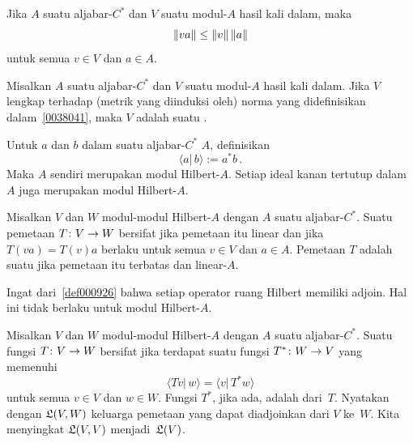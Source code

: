 \begin{prop} Jika $A$ suatu aljabar-$C^*$ dan $V$ suatu modul-$A$ hasil kali dalam, maka
  \[ \lVert va\rVert \le \lVert v\rVert\, \lVert a\rVert \]
untuk semua $v \in V$ dan $a \in A$.
\end{prop}

\begin{defn} Misalkan $A$ suatu aljabar-$C^*$ dan $V$ suatu modul-$A$ hasil kali dalam. Jika $V$
lengkap terhadap (metrik yang diinduksi oleh) norma yang didefinisikan dalam~\ref{0038041},
maka $V$ adalah suatu
.
\end{defn}

\begin{exam}\label{0038111} Untuk $a$ dan $b$ dalam suatu aljabar-$C^*$ $A$,
definisikan
  \[ \langle a \vert\, b\rangle := a^*b\,. \]
Maka $A$ sendiri merupakan modul Hilbert-$A$. Setiap ideal kanan tertutup dalam $A$ juga merupakan
modul Hilbert-$A$.
\end{exam}

\begin{defn} Misalkan $V$ dan $W$ modul-modul Hilbert-$A$ dengan $A$ suatu aljabar-$C^*$. Suatu
pemetaan $T\colon V \rightarrow W$ bersifat
 jika pemetaan itu linear dan jika $T(va) = T(v)a$ berlaku untuk semua $v \in V$ dan $a \in
A$. Pemetaan $T$ adalah suatu
 jika pemetaan itu terbatas dan linear-$A$.
\end{defn}

Ingat dari~\ref{def000926} bahwa setiap operator ruang Hilbert memiliki adjoin.
Hal ini tidak berlaku untuk modul Hilbert-$A$.

\begin{defn} Misalkan $V$ dan $W$ modul-modul Hilbert-$A$ dengan $A$ suatu aljabar-$C^*$. Suatu
fungsi $T\colon V \rightarrow W$ bersifat
 jika terdapat suatu fungsi $T^*\colon W \rightarrow V$ yang memenuhi
  \[ \langle Tv \vert\, w \rangle = \langle v \vert\, T^*w \rangle \]
untuk semua $v \in V$ dan $w \in W$. Fungsi $T^*$, jika ada, adalah
 dari~$T$. Nyatakan dengan
$\mathfrak{L}(V,W)$ keluarga pemetaan yang dapat diadjoinkan dari $V$ ke~$W$. Kita menyingkat $\mathfrak{L}(V,V)$
menjadi~$\mathfrak{L}(V)$.
\end{defn}

